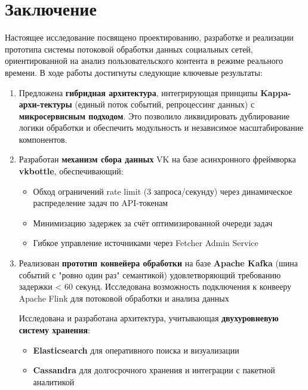 \section{Заключение}
\label{sec:Chapter5} 
    Настоящее исследование посвящено проектированию, разработке и реализации прототипа системы потоковой обработки данных социальных сетей, ориентированной на анализ пользовательского контента в режиме реального времени. В ходе работы достигнуты следующие ключевые результаты:

    \begin{enumerate}
        \item Предложена \textbf{гибридная архитектура}, интегрирующая принципы \textbf{Kappa-архи-тектуры} (единый поток событий, репроцессинг данных) с \textbf{микросервисным подходом}. Это позволило ликвидировать дублирование логики обработки и обеспечить модульность и независимое масштабирование компонентов.
        
        \item Разработан \textbf{механизм сбора данных} VK на базе асинхронного фреймворка \textbf{vkbottle}, обеспечивающий:
        \begin{itemize}
            \item Обход ограничений rate limit (3 запроса/секунду) через динамическое распределение задач по API-токенам
            \item Минимизацию задержек за счёт оптимизированной очереди задач
            \item Гибкое управление источниками через Fetcher Admin Service
        \end{itemize}
        
        \item Реализован \textbf{прототип конвейера обработки} на базе \textbf{Apache Kafka} (шина событий с "ровно один раз" семантикой) удовлетворяющий требованию задержки < 60 секунд. Исследована возможность подключения к конвееру Apache Flink для потоковой обработки и анализа данных
        
        Исследована и разработана архитектура, учитывающая \textbf{двухуровневую систему хранения}:
        \begin{itemize}
            \item \textbf{Elasticsearch} для оперативного поиска и визуализации
            \item \textbf{Cassandra} для долгосрочного хранения и интеграции с пакетной аналитикой
        \end{itemize}
    \end{enumerate}

